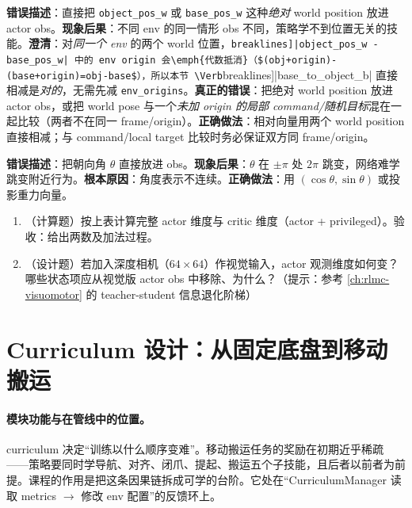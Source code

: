 \begin{pitfall}
\textbf{错误描述}：直接把 \verb|object_pos_w| 或 \verb|base_pos_w| 这种\emph{绝对} world position 放进 actor obs。\textbf{现象后果}：不同 env 的同一情形 obs 不同，策略学不到位置无关的技能。\textbf{澄清}：对\emph{同一个 env} 的两个 world 位置，\Verb[breaklines]|object_pos_w - base_pos_w| 中的 env origin 会\emph{代数抵消}（$(obj+origin)-(base+origin)=obj-base$），所以本节 \Verb[breaklines]|base_to_object_b| 直接相减是\emph{对的}，无需先减 \verb|env_origins|。\textbf{真正的错误}：把绝对 world position 放进 actor obs，或把 world pose 与一个\emph{未加 origin 的局部 command/随机目标}混在一起比较（两者不在同一 frame/origin）。\textbf{正确做法}：相对向量用两个 world position 直接相减；与 command/local target 比较时务必保证双方同 frame/origin。
\end{pitfall}

\begin{pitfall}[用欧拉角表示底盘朝向]
\textbf{错误描述}：把朝向角 $\theta$ 直接放进 obs。\textbf{现象后果}：$\theta$ 在 $\pm\pi$ 处 $2\pi$ 跳变，网络难学跳变附近行为。\textbf{根本原因}：角度表示不连续。\textbf{正确做法}：用 $(\cos\theta,\sin\theta)$ 或投影重力向量。
\end{pitfall}

\begin{practice}[观测设计]
\begin{enumerate}
\item （计算题）按上表计算完整 actor 维度与 critic 维度（actor + privileged）。验收：给出两数及加法过程。
\item （设计题）若加入深度相机（$64\times64$）作视觉输入，actor 观测维度如何变？哪些状态项应从视觉版 actor obs 中移除、为什么？（提示：参考 \cref{ch:rlmc-visuomotor} 的 teacher-student 信息退化阶梯）
\end{enumerate}
\end{practice}

\section{Curriculum 设计：从固定底盘到移动搬运}
\label{sec:rlmc-wh-curriculum}

\paragraph{模块功能与在管线中的位置。}curriculum 决定“训练以什么顺序变难”。移动搬运任务的奖励在初期近乎稀疏——策略要同时学导航、对齐、闭爪、提起、搬运五个子技能，且后者以前者为前提。课程的作用是把这条因果链拆成可学的台阶。它处在“CurriculumManager 读取 metrics $\to$ 修改 env 配置”的反馈环上。


